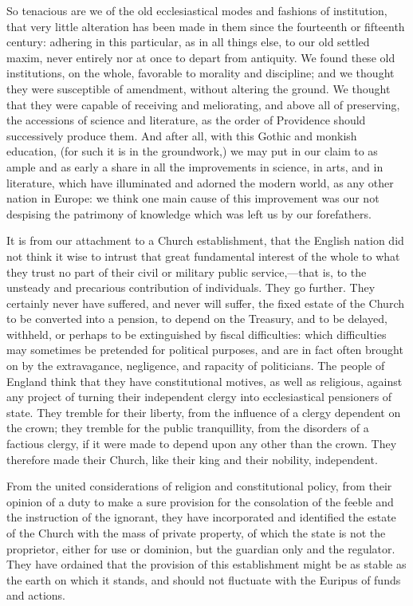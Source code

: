 So tenacious are we of the old ecclesiastical modes and fashions of institution, that very little alteration has been made in them since the fourteenth or fifteenth century: adhering in this particular, as in all things else, to our old settled maxim, never entirely nor at once to depart from antiquity. We found these old institutions, on the whole, favorable to morality and discipline; and we thought they were susceptible of amendment, without altering the ground. We thought that they were capable of receiving and meliorating, and above all of preserving, the accessions of science and literature, as the order of Providence should successively produce them. And after all, with this Gothic and monkish education, (for such it is in the groundwork,) we may put in our claim to as ample and as early a share in all the improvements in science, in arts, and in literature, which have illuminated and adorned the modern world, as any other nation in Europe: we think one main cause of this improvement was our not despising the patrimony of knowledge which was left us by our forefathers.

It is from our attachment to a Church establishment, that the English nation did not think it wise to intrust that great fundamental interest of the whole to what they trust no part of their civil or military public service,—that is, to the unsteady and precarious contribution of individuals. They go further. They certainly never have suffered, and never will suffer, the fixed estate of the Church to be converted into a pension, to depend on the Treasury, and to be delayed, withheld, or perhaps to be extinguished by fiscal difficulties: which difficulties may sometimes be pretended for political purposes, and are in fact often brought on by the extravagance, negligence, and rapacity of politicians. The people of England think that they have constitutional motives, as well as religious, against any project of turning their independent clergy into ecclesiastical pensioners of state. They tremble for their liberty, from the influence of a clergy dependent on the crown; they tremble for the public tranquillity, from the disorders of a factious clergy, if it were made to depend upon any other than the crown. They therefore made their Church, like their king and their nobility, independent.

From the united considerations of religion and constitutional policy, from their opinion of a duty to make a sure provision for the consolation of the feeble and the instruction of the ignorant, they have incorporated and identified the estate of the Church with the mass of private property, of which the state is not the proprietor, either for use or dominion, but the guardian only and the regulator. They have ordained that the provision of this establishment might be as stable as the earth on which it stands, and should not fluctuate with the Euripus of funds and actions.

